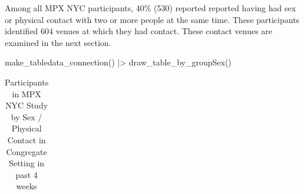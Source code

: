 \documentclass[
  letterpaper,
  DIV=11,
  numbers=noendperiod,
  oneside]{scrreprt}
\newenvironment{Shaded}{\begin{snugshade}}{\end{snugshade}}
\newcommand{\FunctionTok}[1]{\textcolor[rgb]{0.28,0.35,0.67}{#1}}
\newcommand{\NormalTok}[1]{\textcolor[rgb]{0.00,0.23,0.31}{#1}}
\newcommand{\SpecialCharTok}[1]{\textcolor[rgb]{0.37,0.37,0.37}{#1}}
\begin{document}
Among all MPX NYC participants, 40\% (530) reported reported having had
sex or physical contact with two or more people at the same time. These
participants identified \(604\) venues at which they had contact. These
contact venues are examined in the next section.

\begin{Shaded}
\begin{Highlighting}[]
\FunctionTok{make\_tabledata\_connection}\NormalTok{() }\SpecialCharTok{|\textgreater{}}
  \FunctionTok{draw\_table\_by\_groupSex}\NormalTok{()}
\end{Highlighting}
\end{Shaded}

\hypertarget{tbl-connection}{}
\setlength{\LTpost}{0mm}
\begin{longtable}{lcccc}
\caption{\label{tbl-connection}Participants in MPX NYC Study by Sex / Physical Contact in Congregate
Setting in past 4 weeks }\tabularnewline


\end{longtable}
\end{document}
